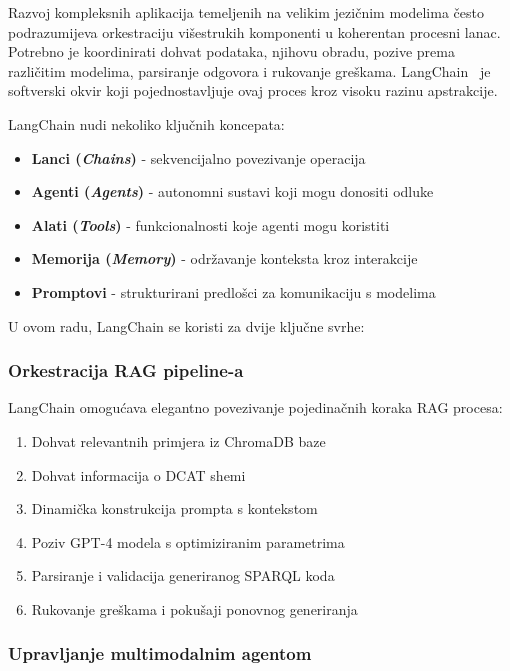Razvoj kompleksnih aplikacija temeljenih na velikim jezičnim modelima često podrazumijeva orkestraciju višestrukih komponenti u koherentan procesni lanac. Potrebno je koordinirati dohvat podataka, njihovu obradu, pozive prema različitim modelima, parsiranje odgovora i rukovanje greškama. LangChain~\cite{chase2022langchain} je softverski okvir koji pojednostavljuje ovaj proces kroz visoku razinu apstrakcije.

LangChain nudi nekoliko ključnih koncepata:

\begin{itemize}
    \item \textbf{Lanci (\textit{Chains})} - sekvencijalno povezivanje operacija
    \item \textbf{Agenti (\textit{Agents})} - autonomni sustavi koji mogu donositi odluke
    \item \textbf{Alati (\textit{Tools})} - funkcionalnosti koje agenti mogu koristiti
    \item \textbf{Memorija (\textit{Memory})} - održavanje konteksta kroz interakcije
    \item \textbf{Promptovi} - strukturirani predlošci za komunikaciju s modelima
\end{itemize}

U ovom radu, LangChain se koristi za dvije ključne svrhe:

\subsubsection{Orkestracija RAG pipeline-a}

LangChain omogućava elegantno povezivanje pojedinačnih koraka RAG procesa:

\begin{enumerate}
    \item Dohvat relevantnih primjera iz ChromaDB baze
    \item Dohvat informacija o DCAT shemi
    \item Dinamička konstrukcija prompta s kontekstom
    \item Poziv GPT-4 modela s optimiziranim parametrima
    \item Parsiranje i validacija generiranog SPARQL koda
    \item Rukovanje greškama i pokušaji ponovnog generiranja
\end{enumerate}

\subsubsection{Upravljanje multimodalnim agentom}

